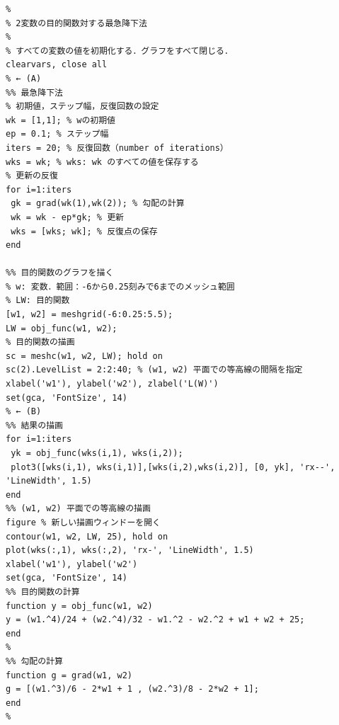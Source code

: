 \documentclass[10pt,a4paper,titlepage]{jreport} %
\begin{document}
\begin{lstlisting}[caption=saikyu21]
% プログラム1.2: saikyu21.m
%
% 2変数の目的関数対する最急降下法
%
% すべての変数の値を初期化する．グラフをすべて閉じる．
clearvars, close all
% ← (A)
%% 最急降下法
% 初期値，ステップ幅，反復回数の設定
wk = [1,1]; % wの初期値
ep = 0.1; % ステップ幅
iters = 20; % 反復回数（number of iterations）
wks = wk; % wks: wk のすべての値を保存する
% 更新の反復
for i=1:iters
 gk = grad(wk(1),wk(2)); % 勾配の計算
 wk = wk - ep*gk; % 更新
 wks = [wks; wk]; % 反復点の保存
end

%% 目的関数のグラフを描く
% w: 変数．範囲：-6から0.25刻みで6までのメッシュ範囲
% LW: 目的関数
[w1, w2] = meshgrid(-6:0.25:5.5);
LW = obj_func(w1, w2);
% 目的関数の描画
sc = meshc(w1, w2, LW); hold on
sc(2).LevelList = 2:2:40; % (w1, w2) 平面での等高線の間隔を指定
xlabel('w1'), ylabel('w2'), zlabel('L(W)')
set(gca, 'FontSize', 14)
% ← (B)
%% 結果の描画
for i=1:iters
 yk = obj_func(wks(i,1), wks(i,2));
 plot3([wks(i,1), wks(i,1)],[wks(i,2),wks(i,2)], [0, yk], 'rx--', 'LineWidth', 1.5)
end
%% (w1, w2) 平面での等高線の描画
figure % 新しい描画ウィンドーを開く
contour(w1, w2, LW, 25), hold on
plot(wks(:,1), wks(:,2), 'rx-', 'LineWidth', 1.5)
xlabel('w1'), ylabel('w2')
set(gca, 'FontSize', 14)
%% 目的関数の計算
function y = obj_func(w1, w2)
y = (w1.^4)/24 + (w2.^4)/32 - w1.^2 - w2.^2 + w1 + w2 + 25; 
end
%
%% 勾配の計算
function g = grad(w1, w2)
g = [(w1.^3)/6 - 2*w1 + 1 , (w2.^3)/8 - 2*w2 + 1]; 
end
%
\end{lstlisting}
\end{document}
